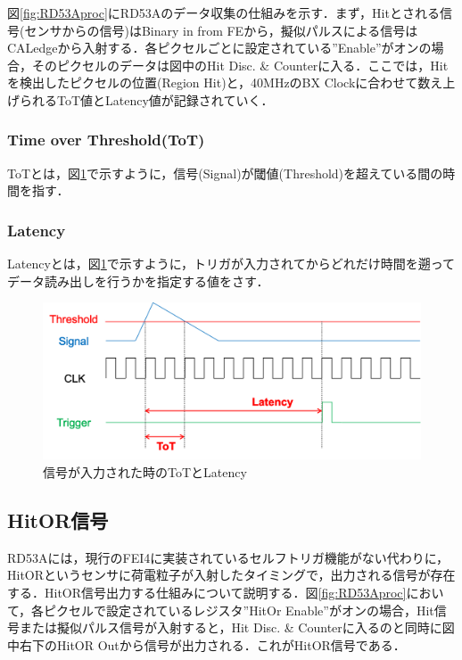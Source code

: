 図\ref{fig:RD53Aproc}にRD53Aのデータ収集の仕組みを示す．まず，Hitとされる信号(センサからの信号)はBinary in from FEから，擬似パルスによる信号はCALedgeから入射する．各ピクセルごとに設定されている''Enable''がオンの場合，そのピクセルのデータは図中のHit Disc. \& Counterに入る．ここでは，Hitを検出したピクセルの位置(Region Hit)と，40$\mathrm{MHz}$のBX Clockに合わせて数え上げられるToT値とLatency値が記録されていく．

\subsubsection*{Time over Threshold(ToT)}
ToTとは，図\ref{fig:tot}で示すように，信号(Signal)が閾値(Threshold)を超えている間の時間を指す．

\subsubsection*{Latency}
Latencyとは，図\ref{fig:tot}で示すように，トリガが入力されてからどれだけ時間を遡ってデータ読み出しを行うかを指定する値をさす．

\begin{figure}[h]
  \centering
  \includegraphics[width=13cm]{./figure/tot.png}
  \caption{信号が入力された時のToTとLatency}
  \label{fig:tot}
\end{figure}



\subsection{HitOR信号}
RD53Aには，現行のFEI4に実装されているセルフトリガ機能がない代わりに，HitORというセンサに荷電粒子が入射したタイミングで，出力される信号が存在する．HitOR信号出力する仕組みについて説明する．図\ref{fig:RD53Aproc}において，各ピクセルで設定されているレジスタ''HitOr Enable''がオンの場合，Hit信号または擬似パルス信号が入射すると，Hit Disc. \& Counterに入るのと同時に図中右下のHitOR Outから信号が出力される．これがHitOR信号である．\par


